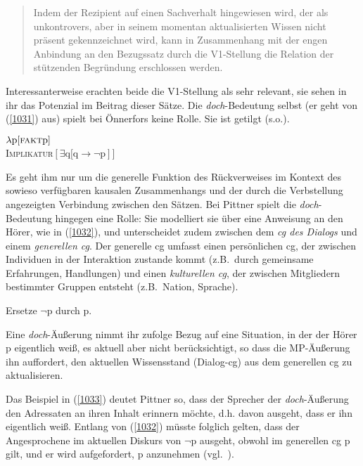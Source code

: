 \begin{quotation}
Indem der Rezipient auf einen Sachverhalt hingewiesen wird, der als unkontrovers, aber in seinem momentan aktualisierten Wissen nicht präsent gekennzeichnet wird, kann in Zusammenhang mit der engen Anbindung an den Bezugssatz durch die V1-Stellung die Relation der stützenden Begründung erschlossen werden.
\hfill\hbox{\citet[170]{Pittner2011}}
\end{quotation}
Interessanterweise erachten beide die V1-Stellung als sehr relevant, sie sehen in ihr das Potenzial im Beitrag dieser Sätze. Die \textit{doch}-Bedeutung selbst (er geht von (\ref{1031}) aus) spielt bei Önnerfors keine Rolle. Sie ist getilgt (s.o.).

\begin{exe}
	\ex\label{1031} 
		$\lambda \textrm{p[\textsc{fakt}p}]$\\
		\textsc{Implikatur}$[\exists \textrm{q[q} \rightarrow \neg \textrm{p}]]$
		\hfill\hbox{\citet[83]{Ormelius-Sandblom1997}}
\end{exe}
Es geht ihm nur um die generelle Funktion des Rückverweises im Kontext des sowieso verfügbaren kausalen Zusammenhangs und der durch die Verbstellung angezeigten Verbindung zwischen den Sätzen. Bei Pittner spielt die \textit{doch}-Bedeu\-tung hingegen eine Rolle: Sie modelliert sie über eine Anweisung an den Hörer, wie in (\ref{1032}), und unterscheidet zudem zwischen dem \textit{cg des Dialogs} und einem  \textit{generellen cg}. Der generelle cg umfasst einen  persönlichen cg, der zwischen Individuen in der Interaktion zustande kommt (z.B.\ durch gemeinsame Erfahrungen, Handlungen) und  einen \textit{kulturellen cg}, der zwischen Mitgliedern bestimmter Gruppen entsteht (z.B.\ Nation, Sprache).

\begin{exe}
	\ex\label{1032} 
	Ersetze $\neg$p durch p.	
	\hfill\hbox{\citet[167]{Pittner2011}}
\end{exe}
Eine \textit{doch}-Äußerung nimmt ihr zufolge Bezug auf eine Situation, in der der Hörer p eigentlich weiß, es aktuell aber nicht berücksichtigt, so dass die MP-Äußerung ihn auffordert, den aktuellen Wissensstand (Dialog-cg) aus dem generellen cg zu aktualisieren. 

Das Beispiel in (\ref{1033}) deutet Pittner so, dass der Sprecher der \textit{doch}-Äußerung den Adressaten an ihren Inhalt erinnern möchte, d.h. davon ausgeht, dass er ihn eigentlich weiß. Entlang von (\ref{1032}) müsste folglich gelten, dass der Angespro\-chene im aktuellen Diskurs von $\neg$p ausgeht, obwohl im generellen cg p gilt, und er wird aufgefordert, p anzunehmen (vgl.\ \citealt[167--168]{Pittner2011}).

